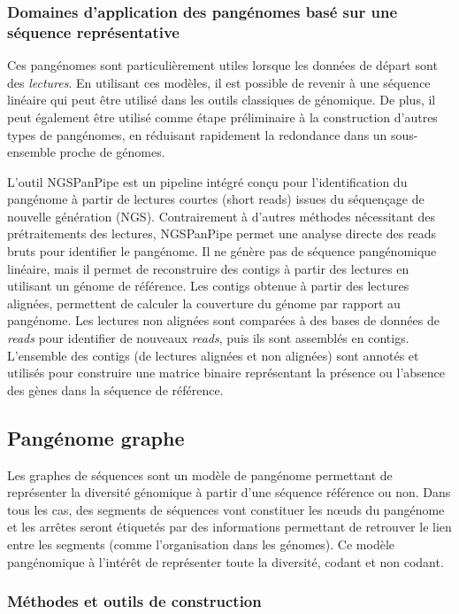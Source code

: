\subsubsection{Domaines d'application des pangénomes basé sur une séquence représentative}

Ces pangénomes sont particulièrement utiles lorsque les données de départ sont des \textit{lectures}. En utilisant ces modèles, il est possible de revenir à une séquence linéaire qui peut être utilisé dans les outils classiques de génomique. De plus, il peut également être utilisé comme étape préliminaire à la construction d'autres types de pangénomes, en réduisant rapidement la redondance dans un sous-ensemble proche de génomes. 

L'outil NGSPanPipe \cite{kulsum_ngspanpipe_2018} est un pipeline intégré conçu pour l'identification du pangénome à partir de lectures courtes (short reads) issues du séquençage de nouvelle génération (NGS). Contrairement à d'autres méthodes nécessitant des prétraitements des lectures, NGSPanPipe permet une analyse directe des reads bruts pour identifier le pangénome. Il ne génère pas de séquence pangénomique linéaire, mais il permet de reconstruire des contigs à partir des lectures en utilisant un génome de référence. Les contigs obtenue à partir des lectures alignées, permettent de calculer la couverture du génome par rapport au pangénome. Les lectures non alignées sont comparées à des bases de données de \textit{reads} pour identifier de nouveaux \textit{reads}, puis ils sont assemblés en contigs. L'ensemble des contigs (de lectures alignées et non alignées) sont annotés et utilisés pour construire une matrice binaire représentant la présence ou l'absence des gènes dans la séquence de référence.

\subsection{Pangénome graphe}

Les graphes de séquences sont un modèle de pangénome permettant de représenter la diversité génomique à partir d'une séquence référence ou non. Dans tous les cas, des segments de séquences vont constituer les n\oe uds du pangénome et les arrêtes seront étiquetés par des informations permettant de retrouver le lien entre les segments (comme l'organisation dans les génomes). Ce modèle pangénomique à l'intérêt de représenter toute la diversité, codant et non codant. 

\subsubsection{Méthodes et outils de construction}

